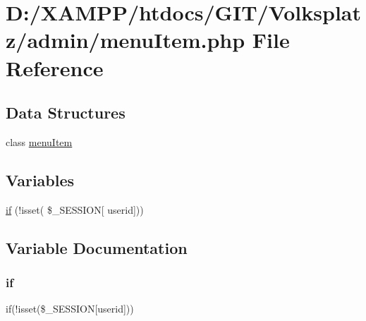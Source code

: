 \hypertarget{admin_2menu_item_8php}{}\section{D\+:/\+X\+A\+M\+P\+P/htdocs/\+G\+I\+T/\+Volksplatz/admin/menu\+Item.php File Reference}
\label{admin_2menu_item_8php}
\subsection*{Data Structures}
\begin{DoxyCompactItemize}
\item 
class \mbox{\hyperlink{classmenu_item}{menu\+Item}}
\end{DoxyCompactItemize}
\subsection*{Variables}
\begin{DoxyCompactItemize}
\item 
\mbox{\hyperlink{admin_2menu_item_8php_ac0971e25a4f61580752c758ef520f6b2}{if}} (!isset( \$\+\_\+\+S\+E\+S\+S\+I\+ON\mbox{[} \textquotesingle{}userid\textquotesingle{}\mbox{]}))
\end{DoxyCompactItemize}


\subsection{Variable Documentation}
\mbox{\label{admin_2menu_item_8php_ac0971e25a4f61580752c758ef520f6b2}} 
\subsubsection{\texorpdfstring{if}{if}}
{\footnotesize\ttfamily if(!isset(\$\+\_\+\+S\+E\+S\+S\+I\+ON\mbox{[}\textquotesingle{}userid\textquotesingle{}\mbox{]}))}


